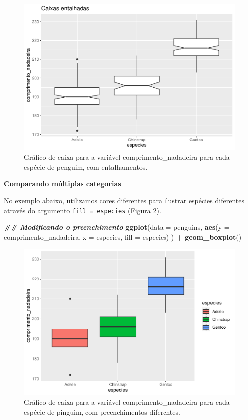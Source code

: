 \documentclass[
]{article}
\newenvironment{Shaded}{\begin{snugshade}}{\end{snugshade}}
\newcommand{\AttributeTok}[1]{\textcolor[rgb]{0.13,0.29,0.53}{#1}}
\newcommand{\DocumentationTok}[1]{\textcolor[rgb]{0.56,0.35,0.01}{\textbf{\textit{#1}}}}
\newcommand{\FunctionTok}[1]{\textcolor[rgb]{0.13,0.29,0.53}{\textbf{#1}}}
\newcommand{\NormalTok}[1]{#1}
\newcommand{\SpecialCharTok}[1]{\textcolor[rgb]{0.81,0.36,0.00}{\textbf{#1}}}
\begin{document}
\begin{figure}
\includegraphics[width=0.75\linewidth,height=0.75\textheight]{epr_files/figure-latex/fig-boxplot-notched-1} \caption{Gráfico de caixa para a variável comprimento_nadadeira para cada espécie de penguim, com entalhamentos.}\label{fig:fig-boxplot-notched}
\end{figure}

\textbf{Comparando múltiplas categorias}

No exemplo abaixo, utilizamos cores diferentes para ilustrar espécies diferentes através do argumento \texttt{fill\ =\ especies} (Figura \ref{fig:fig-boxplot-cat}).

\begin{Shaded}
\begin{Highlighting}[]
\DocumentationTok{\#\# Modificando o preenchimento}
\FunctionTok{ggplot}\NormalTok{(}\AttributeTok{data =}\NormalTok{ penguins, }
       \FunctionTok{aes}\NormalTok{(}\AttributeTok{y =}\NormalTok{ comprimento\_nadadeira, }\AttributeTok{x =}\NormalTok{ especies, }\AttributeTok{fill =}\NormalTok{ especies)}
\NormalTok{       ) }\SpecialCharTok{+}
    \FunctionTok{geom\_boxplot}\NormalTok{()}
\end{Highlighting}
\end{Shaded}

\begin{figure}
\includegraphics[width=0.75\linewidth,height=0.75\textheight]{epr_files/figure-latex/fig-boxplot-cat-1} \caption{Gráfico de caixa para a variável comprimento_nadadeira para cada espécie de pinguim, com preenchimentos diferentes.}\label{fig:fig-boxplot-cat}
\end{figure}
\end{document}
